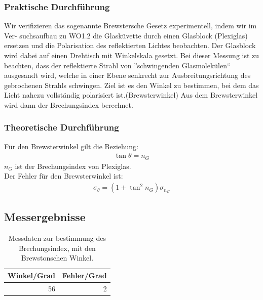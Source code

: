 \documentclass[12pt]{scrartcl}
\begin{document}
\subsubsection{Praktische Durchführung}
Wir verifizieren das sogenannte Brewstersche Gesetz experimentell, indem wir im Ver-
suchsaufbau zu WO1.2 die Glasküvette durch einen Glasblock (Plexiglas) ersetzen und
die Polarisation des reflektierten Lichtes beobachten.
Der Glasblock wird dabei auf einen Drehtisch mit Winkelskala gesetzt.
Bei dieser Messung ist zu beachten, dass der reflektierte Strahl von ”schwingenden Glasmolekülen“ ausgesandt wird, welche in einer Ebene
senkrecht zur Ausbreitungsrichtung des gebrochenen Strahls schwingen.
Ziel ist es den Winkel zu bestimmen, bei dem das Licht nahezu vollständig polarisiert ist.(Brewsterwinkel)
Aus dem Brewsterwinkel wird dann %
der Brechungsindex berechnet.
\subsubsection{Theoretische Durchführung}
Für den Brewsterwinkel gilt die Beziehung:
\begin{align}
\tan{\theta} = n_G
\label{eqn:a_2}
\end{align}
$n_G$ ist der Brechungsindex von Plexiglas.\\
Der Fehler für den Brewsterwinkel ist:
\begin{align}
\sigma_\theta = (1+\tan^2{n_G})\sigma_{n_G}
\label{eqn:a_2_sigma}
\end{align}
\subsection{Messergebnisse}
\begin{table}[htbp]
\caption{Messdaten zur bestimmung des Brechungsindex, mit den Brewstonschen Winkel.}
\begin{center}
\begin{tabular}{|l|l|}
\hline
Winkel/Grad & Fehler/Grad \\ \hline
\multicolumn{1}{|r|}{56} & \multicolumn{1}{r|}{2} \\ \hline
\end{tabular}
\end{center}
\label{tab:a_4}
\end{table}
\end{document}
